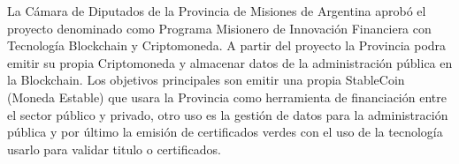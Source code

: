 La Cámara de Diputados de la Provincia de Misiones de Argentina aprobó el proyecto denominado como 
Programa Misionero de Innovación Financiera con Tecnología Blockchain y Criptomoneda. A partir del proyecto
la Provincia podra emitir su propia Criptomoneda y almacenar datos de la administración pública en la Blockchain.
Los objetivos principales son emitir una propia StableCoin (Moneda Estable) que usara la Provincia como herramienta de financiación entre el sector público
y privado, otro uso es la gestión de datos para la administración pública y por último la emisión de certificados verdes con el uso de la tecnología 
usarlo para validar titulo o certificados. \cite[]{clementin_provincia_2021}


